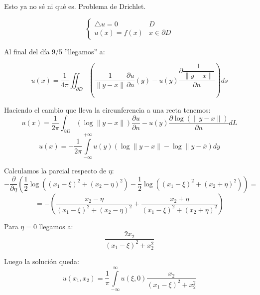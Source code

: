 \documentclass[openany]{book}
\begin{document}
\begin{exercise}
  Esto ya no sé ni qué es. Problema de Drichlet.

  $$ \left\{
  \begin{array}{ll}
    \bigtriangleup u = 0 & D\\ 
    u(x) = f(x) & x \in \partial D 
  \end{array}
  \right. $$

  Al final del día 9/5 ''llegamos'' a:

  $$ u(x) = \dfrac{1}{4\pi} \iint_{\partial D} \left(\dfrac{1}{\|y-x\|} \dfrac{\partial u}{\partial n}(y) - u(y) \dfrac{\partial \dfrac{1}{\|y-x\|}}{\partial n}\right) ds $$

  Haciendo el cambio que lleva la circunferencia a una recta tenemos:
  $$ u(x) = \dfrac{1}{2\pi } \int_{\partial D} (\log{\|y-x\|}) \dfrac{\partial u}{\partial n}-u(y) \dfrac{\partial \log{(\|y-x\|)}}{\partial n}dL $$
  $$ u(x) = -\dfrac{1}{2\pi} \int\limits_{-\infty}^{+\infty} u(y) (\log{\|y-x\|}-\log{\|y-\overline{x}}) dy$$

  Calculamos la parcial respecto de $ \eta $:
  $$ - \dfrac{\partial }{\partial \eta} \left( \dfrac{1}{2} \log{((x_1-\xi)^2+(x_2-\eta)^2)}-\dfrac{1}{2}\log{((x_1-\xi)^2+(x_2+\eta)^2)} \right) =$$
  $$ = - \left( \dfrac{x_2-\eta}{(x_1-\xi)^2+(x_2-\eta)^2} + \dfrac{x_2+\eta}{(x_1-\xi)^2+(x_2+\eta)^2} \right) $$

  Para $ \eta = 0 $ llegamos a:
  $$ \dfrac{2x_2}{(x_1-\xi)^2+x_2^2} $$

  Luego la solución queda:
  $$ u(x_1,x_2) = \dfrac{1}{\pi} \int\limits_{-\infty}^{\infty} u(\xi,0) \dfrac{x_2}{(x_1-\xi)^2+x_2^2} $$


\end{exercise}

\setcounter{ex}{5}
\end{document}
